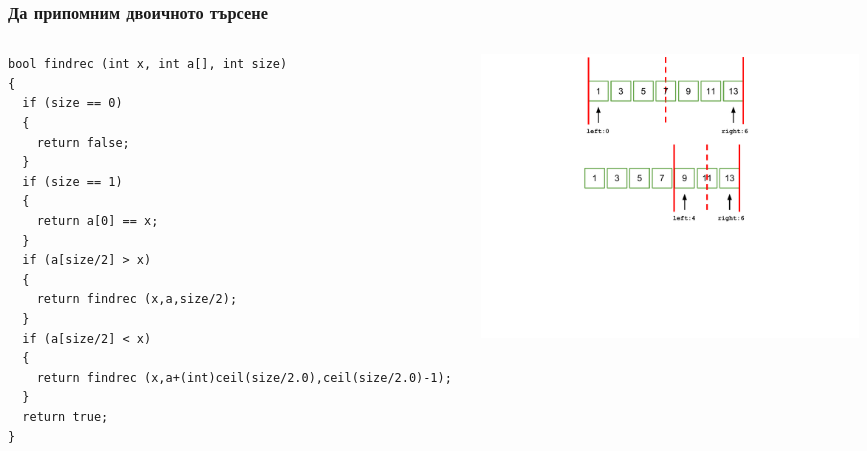 \documentclass{beamer}
\begin{document}
\begin{frame}[fragile]
\frametitle{Да припомним двоичното търсене}



\begin{columns}[t]
  \begin{column}{0.5\textwidth}

\begin{lstlisting}
bool findrec (int x, int a[], int size)
{
  if (size == 0)
  {
    return false;
  }
  if (size == 1)
  {
    return a[0] == x;
  }
  if (a[size/2] > x)
  {
    return findrec (x,a,size/2);
  }
  if (a[size/2] < x)
  {
    return findrec (x,a+(int)ceil(size/2.0),ceil(size/2.0)-1);
  }
  return true;
}
\end{lstlisting}


  \end{column}
  \begin{column}{0.5\textwidth}
\vspace*{-1pt}
\hspace*{-50pt}
\includegraphics[width=10cm]{images/binsearch_smaller}

  \end{column}
\end{columns}



\end{frame}
\end{document}
